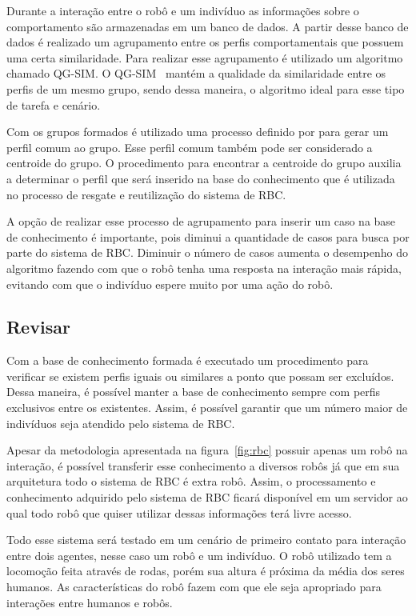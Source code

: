 Durante a interação entre o robô e um indivíduo as informações sobre o comportamento são armazenadas em um banco de dados. A partir desse banco de dados é realizado um agrupamento entre os perfis comportamentais que possuem uma certa similaridade. Para realizar esse agrupamento é utilizado um algoritmo chamado QG-SIM. O QG-SIM~\cite{Masiero:2013} mantém a qualidade da similaridade entre os perfis de um mesmo grupo, sendo dessa maneira, o algoritmo ideal para esse tipo de tarefa e cenário.

Com os grupos formados é utilizado uma processo definido por  para gerar um perfil comum ao grupo. Esse perfil comum também pode ser considerado a centroide do grupo. O procedimento para encontrar a centroide do grupo auxilia a determinar o perfil que será inserido na base do conhecimento que é utilizada no processo de resgate e reutilização do sistema de RBC.

A opção de realizar esse processo de agrupamento para inserir um caso na base de conhecimento é importante, pois diminui a quantidade de casos para busca por parte do sistema de RBC. Diminuir o número de casos aumenta o desempenho do algoritmo fazendo com que o robô tenha uma resposta na interação mais rápida, evitando com que o indivíduo espere muito por uma ação do robô.

\subsection{Revisar}
\label{sec:revisar}

Com a base de conhecimento formada é executado um procedimento para verificar se existem perfis iguais ou similares a ponto que possam ser excluídos. Dessa maneira, é possível manter a base de conhecimento sempre com perfis exclusivos entre os existentes. Assim, é possível garantir que um número maior de indivíduos seja atendido pelo sistema de RBC.

Apesar da metodologia apresentada na figura~\ref{fig:rbc} possuir apenas um robô na interação, é possível transferir esse conhecimento a diversos robôs já que em sua arquitetura todo o sistema de RBC é extra robô. Assim, o processamento e conhecimento adquirido pelo sistema de RBC ficará disponível em um servidor ao qual todo robô que quiser utilizar dessas informações terá livre acesso.

Todo esse sistema será testado em um cenário de primeiro contato para interação entre dois agentes, nesse caso um robô e um indivíduo. O robô utilizado tem a locomoção feita através de rodas, porém sua altura é próxima da média dos seres humanos. As características do robô fazem com que ele seja apropriado para interações entre humanos e robôs.